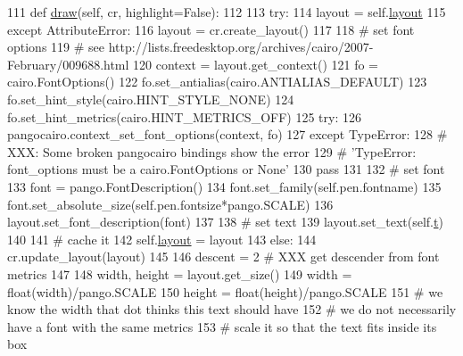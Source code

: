 \begin{DoxyCode}
111     \textcolor{keyword}{def }\hyperlink{classsmacc__viewer_1_1xdot_1_1xdot_1_1TextShape_ac53196344e8e2cfe46da24419aed0397}{draw}(self, cr, highlight=False):
112 
113         \textcolor{keywordflow}{try}:
114             layout = self.\hyperlink{classsmacc__viewer_1_1xdot_1_1xdot_1_1TextShape_a103766aba4c4460fabf61921f113bb4d}{layout}
115         \textcolor{keywordflow}{except} AttributeError:
116             layout = cr.create\_layout()
117 
118             \textcolor{comment}{# set font options}
119             \textcolor{comment}{# see http://lists.freedesktop.org/archives/cairo/2007-February/009688.html}
120             context = layout.get\_context()
121             fo = cairo.FontOptions()
122             fo.set\_antialias(cairo.ANTIALIAS\_DEFAULT)
123             fo.set\_hint\_style(cairo.HINT\_STYLE\_NONE)
124             fo.set\_hint\_metrics(cairo.HINT\_METRICS\_OFF)
125             \textcolor{keywordflow}{try}:
126                 pangocairo.context\_set\_font\_options(context, fo)
127             \textcolor{keywordflow}{except} TypeError:
128                 \textcolor{comment}{# XXX: Some broken pangocairo bindings show the error}
129                 \textcolor{comment}{# 'TypeError: font\_options must be a cairo.FontOptions or None'}
130                 \textcolor{keywordflow}{pass}
131 
132             \textcolor{comment}{# set font}
133             font = pango.FontDescription()
134             font.set\_family(self.pen.fontname)
135             font.set\_absolute\_size(self.pen.fontsize*pango.SCALE)
136             layout.set\_font\_description(font)
137 
138             \textcolor{comment}{# set text}
139             layout.set\_text(self.\hyperlink{classsmacc__viewer_1_1xdot_1_1xdot_1_1TextShape_a4cf31f74ca22cecf522c155199204abb}{t})
140 
141             \textcolor{comment}{# cache it}
142             self.\hyperlink{classsmacc__viewer_1_1xdot_1_1xdot_1_1TextShape_a103766aba4c4460fabf61921f113bb4d}{layout} = layout
143         \textcolor{keywordflow}{else}:
144             cr.update\_layout(layout)
145 
146         descent = 2 \textcolor{comment}{# XXX get descender from font metrics}
147 
148         width, height = layout.get\_size()
149         width = float(width)/pango.SCALE
150         height = float(height)/pango.SCALE
151         \textcolor{comment}{# we know the width that dot thinks this text should have}
152         \textcolor{comment}{# we do not necessarily have a font with the same metrics}
153         \textcolor{comment}{# scale it so that the text fits inside its box}

\end{DoxyCode}
